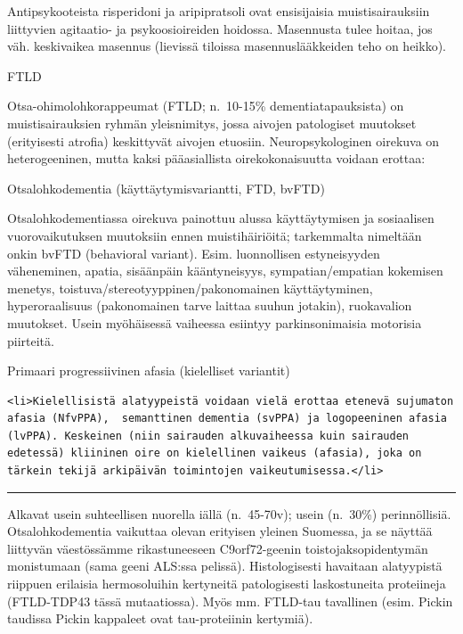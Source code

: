 \documentclass[
]{book}
\begin{document}
Antipsykooteista risperidoni ja aripipratsoli ovat ensisijaisia muistisairauksiin liittyvien agitaatio- ja psykoosioireiden hoidossa. Masennusta tulee hoitaa, jos väh. keskivaikea masennus (lievissä tiloissa masennuslääkkeiden teho on heikko).

FTLD

Otsa-ohimolohkorappeumat (FTLD; n.~10-15\% dementiatapauksista) on muistisairauksien ryhmän yleisnimitys, jossa aivojen patologiset muutokset (erityisesti atrofia) keskittyvät aivojen etuosiin. Neuropsykologinen oirekuva on heterogeeninen, mutta kaksi pääasiallista oirekokonaisuutta voidaan erottaa:

Otsalohkodementia (käyttäytymisvariantti, FTD, bvFTD)

Otsalohkodementiassa oirekuva painottuu alussa käyttäytymisen ja sosiaalisen vuorovaikutuksen muutoksiin ennen muistihäiriöitä; tarkemmalta nimeltään onkin bvFTD (behavioral variant). Esim. luonnollisen estyneisyyden väheneminen, apatia, sisäänpäin kääntyneisyys, sympatian/empatian kokemisen menetys, toistuva/stereotyyppinen/pakonomainen käyttäytyminen, hyperoraalisuus (pakonomainen tarve laittaa suuhun jotakin), ruokavalion muutokset. Usein myöhäisessä vaiheessa esiintyy parkinsonimaisia motorisia piirteitä.

Primaari progressiivinen afasia (kielelliset variantit)

\begin{verbatim}
<li>Kielellisistä alatyypeistä voidaan vielä erottaa etenevä sujumaton afasia (NfvPPA),  semanttinen dementia (svPPA) ja logopeeninen afasia (lvPPA). Keskeinen (niin sairauden alkuvaiheessa kuin sairauden edetessä) kliininen oire on kielellinen vaikeus (afasia), joka on tärkein tekijä arkipäivän toimintojen vaikeutumisessa.</li>
\end{verbatim}

\begin{center}\rule{0.5\linewidth}{0.5pt}\end{center}

Alkavat usein suhteellisen nuorella iällä (n.~45-70v); usein (n.~30\%) perinnöllisiä. Otsalohkodementia vaikuttaa olevan erityisen yleinen Suomessa, ja se näyttää liittyvän väestössämme rikastuneeseen C9orf72-geenin toistojaksopidentymän monistumaan (sama geeni ALS:ssa pelissä). Histologisesti havaitaan alatyypistä riippuen erilaisia hermosoluihin kertyneitä patologisesti laskostuneita proteiineja (FTLD-TDP43 tässä mutaatiossa). Myös mm. FTLD-tau tavallinen (esim. Pickin taudissa Pickin kappaleet ovat tau-proteiinin kertymiä).
\end{document}
